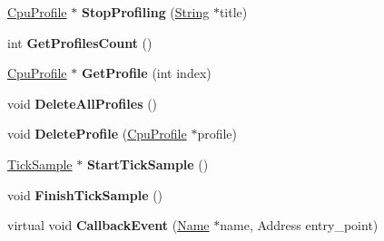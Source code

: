 \begin{DoxyCompactItemize}
\item 
\hypertarget{classv8_1_1internal_1_1_cpu_profiler_a996e1a7b3a9ec4397e4a35cc2e427089}{}\hyperlink{classv8_1_1internal_1_1_cpu_profile}{Cpu\+Profile} $\ast$ {\bfseries Stop\+Profiling} (\hyperlink{classv8_1_1internal_1_1_string}{String} $\ast$title)\label{classv8_1_1internal_1_1_cpu_profiler_a996e1a7b3a9ec4397e4a35cc2e427089}

\item 
\hypertarget{classv8_1_1internal_1_1_cpu_profiler_a90fbf0a71839b8d0839a17ee368f3f8b}{}int {\bfseries Get\+Profiles\+Count} ()\label{classv8_1_1internal_1_1_cpu_profiler_a90fbf0a71839b8d0839a17ee368f3f8b}

\item 
\hypertarget{classv8_1_1internal_1_1_cpu_profiler_a2461e90f11f7197a17ac783770794daf}{}\hyperlink{classv8_1_1internal_1_1_cpu_profile}{Cpu\+Profile} $\ast$ {\bfseries Get\+Profile} (int index)\label{classv8_1_1internal_1_1_cpu_profiler_a2461e90f11f7197a17ac783770794daf}

\item 
\hypertarget{classv8_1_1internal_1_1_cpu_profiler_abf236281634b032566ef3e1153319892}{}void {\bfseries Delete\+All\+Profiles} ()\label{classv8_1_1internal_1_1_cpu_profiler_abf236281634b032566ef3e1153319892}

\item 
\hypertarget{classv8_1_1internal_1_1_cpu_profiler_af88e6831fb01b203b0a110077f1260f0}{}void {\bfseries Delete\+Profile} (\hyperlink{classv8_1_1internal_1_1_cpu_profile}{Cpu\+Profile} $\ast$profile)\label{classv8_1_1internal_1_1_cpu_profiler_af88e6831fb01b203b0a110077f1260f0}

\item 
\hypertarget{classv8_1_1internal_1_1_cpu_profiler_a41a15d3b6abbc14884d4d60ee70d2718}{}\hyperlink{structv8_1_1internal_1_1_tick_sample}{Tick\+Sample} $\ast$ {\bfseries Start\+Tick\+Sample} ()\label{classv8_1_1internal_1_1_cpu_profiler_a41a15d3b6abbc14884d4d60ee70d2718}

\item 
\hypertarget{classv8_1_1internal_1_1_cpu_profiler_a3e8d41e0a442925fcbf1d8b67a3589ea}{}void {\bfseries Finish\+Tick\+Sample} ()\label{classv8_1_1internal_1_1_cpu_profiler_a3e8d41e0a442925fcbf1d8b67a3589ea}

\item 
\hypertarget{classv8_1_1internal_1_1_cpu_profiler_a7370854afaffd0a92ceb21cab25c8794}{}virtual void {\bfseries Callback\+Event} (\hyperlink{classv8_1_1internal_1_1_name}{Name} $\ast$name, Address entry\+\_\+point)\label{classv8_1_1internal_1_1_cpu_profiler_a7370854afaffd0a92ceb21cab25c8794}


\end{DoxyCompactItemize}
